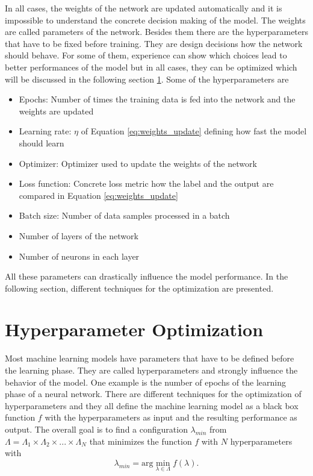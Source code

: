 In all cases, the weights of the network are updated automatically and it is impossible to understand the concrete decision making of the model. The weights are called parameters of the network. Besides them there are the hyperparameters that have to be fixed before training. They are design decisions how the network should behave. For some of them, experience can show which choices lead to better performances of the model but in all cases, they can be optimized which will be discussed in the following section \ref{sec:hyperparameter_optimization}. Some of the hyperparameters are
\begin{itemize}
	\item Epochs: Number of times the training data is fed into the network and the weights are updated
	\item Learning rate: $ \eta $ of Equation \ref{eq:weights_update} defining how fast the model should learn
	\item Optimizer: Optimizer used to update the weights of the network
	\item Loss function: Concrete loss metric how the label and the output are compared in Equation \ref{eq:weights_update}
	\item Batch size: Number of data samples processed in a batch
	\item Number of layers of the network
	\item Number of neurons in each layer
\end{itemize}

All these parameters can drastically influence the model performance. In the following section, different techniques for the optimization are presented.


\section{Hyperparameter Optimization}\label{sec:hyperparameter_optimization}

Most machine learning models have parameters that have to be defined before the learning phase. They are called hyperparameters and strongly influence the behavior of the model. One example is the number of epochs of the learning phase of a neural network. There are different techniques for the optimization of hyperparameters and they all define the machine learning model as a black box function $ f $ with the hyperparameters as input and the resulting performance as output. The overall goal is to find a configuration $ \lambda_{min} $ from $ \Lambda = \Lambda_1 \times \Lambda_2 \times ... \times \Lambda_N $ that minimizes the function $ f $ with $ N $ hyperparameters with 
\begin{equation}
	\label{eq:optimization}
	\lambda_{min} = \text{arg} \min_{\lambda \in \Lambda} f(\lambda) .
\end{equation}

